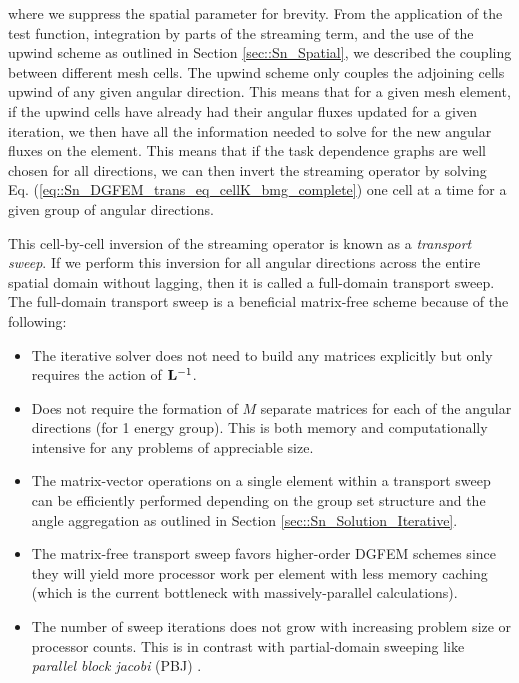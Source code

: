 \noindent where we suppress the spatial parameter for brevity. From the application of the test function, integration by parts of the streaming term, and the use of the upwind scheme as outlined in Section \ref{sec::Sn_Spatial}, we described the coupling between different mesh cells. The upwind scheme only couples the adjoining cells upwind of any given angular direction. This means that for a given mesh element, if the upwind cells have already had their angular fluxes updated for a given iteration, we then have all the information needed to solve for the new angular fluxes on the element. This means that if the task dependence graphs are well chosen for all directions, we can then invert the streaming operator by solving Eq. (\ref{eq::Sn_DGFEM_trans_eq_cellK_bmg_complete}) one cell at a time for a given group of angular directions. 

This cell-by-cell inversion of the streaming operator is known as a {\em transport sweep}. If we perform this inversion for all angular directions across the entire spatial domain without lagging, then it is called a full-domain transport sweep. The full-domain transport sweep is a beneficial matrix-free scheme because of the following:

\begin{itemize}
\item The iterative solver does not need to build any matrices explicitly but only requires the action of ${\bf L}^{-1}$.
\item Does not require the formation of $M$ separate matrices for each of the angular directions (for 1 energy group). This is both memory and computationally intensive for any problems of appreciable size.
\item The matrix-vector operations on a single element within a transport sweep can be efficiently performed depending on the group set structure and the angle aggregation as outlined in Section \ref{sec::Sn_Solution_Iterative}.
\item The matrix-free transport sweep favors higher-order DGFEM schemes since they will yield more processor work per element with less memory caching (which is the current bottleneck with massively-parallel calculations).
\item The number of sweep iterations does not grow with increasing problem size or processor counts. This is in contrast with partial-domain sweeping like {\em parallel block jacobi} (PBJ) \cite{zerr2011solution}.
\end{itemize}

